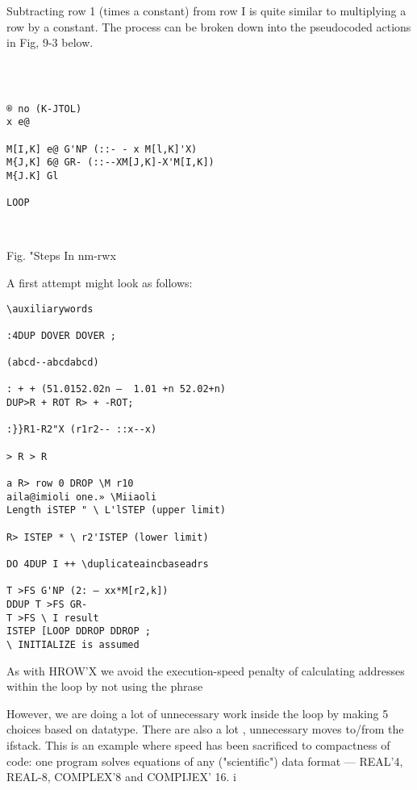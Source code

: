 {{{{{{{{{%

Subtracting row 1 (times a constant) from row I is quite similar to
multiplying a row by a constant. The process can be broken down
into the pseudocoded actions in Fig, 9-3 below.

 
\begin{verbatim}

 

® no (K-JTOL)
x e@

M[I,K] e@ G'NP (::- - x M[l,K]'X)
M{J,K] 6@ GR- (::--XM[J,K]-X'M[I,K])
M{J.K] Gl

LOOP

 

\end{verbatim} 

Fig. "Steps In nm-rwx

A ﬁrst attempt might look as follows:

\begin{verbatim}
\auxiliarywords

:4DUP DOVER DOVER ;

(abcd--abcdabcd)

: + + (51.0152.02n —  1.01 +n 52.02+n)
DUP>R + ROT R> + -ROT;

:}}R1-R2"X (r1r2-- ::x--x)

> R > R

a R> row 0 DROP \M r10
aila@imioli one.» \Miiaoli
Length iSTEP " \ L'lSTEP (upper limit)

R> ISTEP * \ r2'ISTEP (lower limit)

DO 4DUP I ++ \duplicateaincbaseadrs

T >FS G'NP (2: — xx*M[r2,k])
DDUP T >FS GR-
T >FS \ I result
ISTEP [LOOP DDROP DDROP ;
\ INITIALIZE is assumed

\end{verbatim} 
As with HROW'X we avoid the execution-speed penalty of
calculating addresses within the loop by not using the phrase




     
  
 
 
 

However, we are doing a lot of unnecessary work inside the loop
by making 5 choices based on datatype. There are also a lot ,
unnecessary moves to/from the ifstack. This is an example where
speed has been sacriﬁced to compactness of code: one program
solves equations of any ("scientiﬁc") data format — REAL'4,
REAL-8, COMPLEX'8 and COMPIJEX' 16. i

}}}}}}}}}
